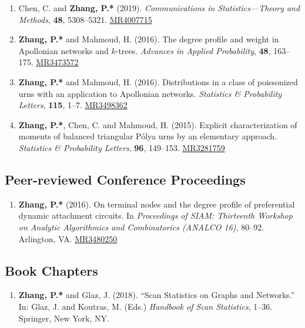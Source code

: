 \documentclass[margin]{res}
\def\MR#1{\href{http://www.ams.org/mathscinet-getitem?mr=#1}{MR#1}}
\begin{document}
\begin{resume}
\begin{enumerate}
	profile and Gini index of random caterpillar trees. {\em 
	Probability in Engineering and Informational Sciences}, 
	\textbf{33}, 511--527. \MR{4010508}
	\item {\sc Chen, C.} and {\sc \bf Zhang, P.*} (2019). {\em 
	Communications in Statistics---Theory and Methods}, \textbf{48}, 
	5308--5321. \MR{4007715}
	\item {\sc \bf Zhang, P.*} and {\sc Mahmoud, H.} (2016). The degree profile and weight in Apollonian networks and $k$-trees. \emph{Advances in Applied Probability}, \textbf{48}, 163--175. \MR{3473572}
	\item {\sc \bf Zhang, P.*} and {\sc Mahmoud, H.} (2016). Distributions in a class of poissonized urns with an application to Apollonian networks. \emph{Statistics \& Probability Letters}, {\bf 115}, 1--7. \MR{3498362}
	\item {\sc \bf Zhang, P.*}, {\sc Chen, C.} and {\sc Mahmoud, H.} (2015). Explicit characterization of moments of balanced triangular P\'{o}lya urns by an elementary approach. \emph{Statistics \& Probability Letters}, {\bf 96}, 149--153. \MR{3281759}
\end{enumerate} 

\subsection{Peer-reviewed Conference Proceedings}
\begin{enumerate}
	\item {\sc \bf Zhang, P.*} (2016). On terminal nodes and the degree profile of preferential dynamic attachment circuits. In \emph{Proceedings of SIAM: Thirteenth Workshop on Analytic Algorithmics and Combinatorics (ANALCO 16)}, 80--92. Arlington, VA. \MR{3480250}
\end{enumerate}

\subsection{Book Chapters}
\begin{enumerate}
	\item {\sc \bf Zhang, P.*} and {\sc Glaz, J.} (2018). ``Scan 
	Statistics on Graphs and Networks.'' In: Glaz, J. and Koutras, 
	M. (Eds.) {\em Handbook of Scan Statistics}, 1--36. Springer, 
	New York, NY. 
\end{enumerate}


\end{resume}
\end{document}
